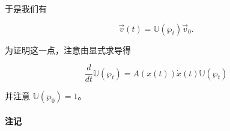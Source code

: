 于是我们有

\begin{equation}
  \vec{v}(t) = \mathbb{U}(\wp_t)\vec{v}_0.
  \tag{H.6}
  \label{eq:H.6}
\end{equation}

为证明这一点，注意由显式求导得

\begin{equation}
  \frac{d}{dt}\mathbb{U}(\wp_t) = A(x(t))\dot{x}(t)\mathbb{U}(\wp_t)
  \tag{H.7}
  \label{eq:H.7}
\end{equation}

并注意 $\mathbb{U}(\wp_0)=1$。

\paragraph{注记}

